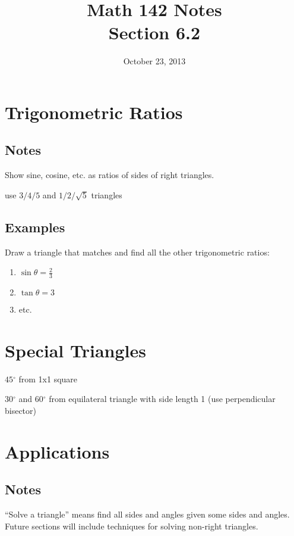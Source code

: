 \documentclass{exam}
\title{Math 142 Notes \\ Section 6.2}
\date{October 23, 2013}
\newcommand{\dg}{\ensuremath{^\circ}}
\begin{document}
  \maketitle
  \tableofcontents

  \section{Trigonometric Ratios}

  \subsection{Notes}
  \begin{itemize*}
    \item Show sine, cosine, etc. as ratios of sides of right triangles.
    \item use $3/4/5$ and $1/2/\sqrt{5}$ triangles
  \end{itemize*}

  \subsection{Examples}
  Draw a triangle that matches and find all the other trigonometric ratios:
  \begin{enumerate}
    \item $\sin \theta = \frac{2}{3}$  
    \item $\tan \theta = 3$
    \item etc.
  \end{enumerate}

  \section{Special Triangles}

  \begin{itemize*}
    \item $45 \dg$ from 1x1 square 
    \item $30 \dg$ and $60 \dg$ from equilateral triangle with side length 1 (use perpendicular bisector)
  \end{itemize*}

  \section{Applications}

  \subsection{Notes}
  ``Solve a triangle'' means find all sides and angles given some sides and angles.  Future sections will include
  techniques for solving non-right triangles.
\end{document}
